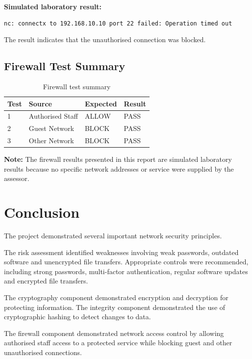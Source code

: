 \documentclass[12pt,a4paper]{article}
\begin{document}
\textbf{Simulated laboratory result:}

\begin{lstlisting}
nc: connectx to 192.168.10.10 port 22 failed: Operation timed out
\end{lstlisting}

The result indicates that the unauthorised connection was blocked.

\subsection{Firewall Test Summary}

\begin{table}[h]
\centering
\begin{tabular}{llll}
\toprule
\textbf{Test} & \textbf{Source} & \textbf{Expected} & \textbf{Result} \\
\midrule
1 & Authorised Staff & ALLOW & PASS \\
2 & Guest Network & BLOCK & PASS \\
3 & Other Network & BLOCK & PASS \\
\bottomrule
\end{tabular}
\caption{Firewall test summary}
\end{table}

\textbf{Note:} The firewall results presented in this report are
simulated laboratory results because no specific network addresses or
service were supplied by the assessor.

\section{Conclusion}

The project demonstrated several important network security principles.

The risk assessment identified weaknesses involving weak passwords,
outdated software and unencrypted file transfers. Appropriate controls
were recommended, including strong passwords, multi-factor
authentication, regular software updates and encrypted file transfers.

The cryptography component demonstrated encryption and decryption for
protecting information. The integrity component demonstrated the use of
cryptographic hashing to detect changes to data.

The firewall component demonstrated network access control by allowing
authorised staff access to a protected service while blocking guest and
other unauthorised connections.
\end{document}
